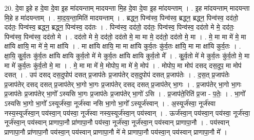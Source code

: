 \documentclass[17pt]{extarticle}
\begin{document}
20. दे॒वा इ॒हे ह दे॒वा दे॒वा इ॒ह मा॑दयन्ताम् मादयन्ता मि॒ह दे॒वा दे॒वा इ॒ह मा॑दयन्ताम् । . इ॒ह मा॑दयन्ताम् मादयन्ता मि॒हे ह मा॑दयन्ताम् । . मा॒द॒य॒न्ता॒मिति॑ मादयन्ताम् । . ब्रद्ध्न॒ पिन्व॑स्व॒ पिन्व॑स्व॒ ब्रद्ध्न॒ ब्रद्ध्न॒ पिन्व॑स्व॒ दद॑तो॒ दद॑तः॒ पिन्व॑स्व॒ ब्रद्ध्न॒ ब्रद्ध्न॒ पिन्व॑स्व॒ दद॑तः । . पिन्व॑स्व॒ दद॑तो॒ दद॑तः॒ पिन्व॑स्व॒ पिन्व॑स्व॒ दद॑तो मे मे॒ दद॑तः॒ पिन्व॑स्व॒ पिन्व॑स्व॒ दद॑तो मे । . दद॑तो मे मे॒ दद॑तो॒ दद॑तो मे॒ मा मा मे॒ दद॑तो॒ दद॑तो मे॒ मा । . मे॒ मा मा मे॑ मे॒ मा क्षा॑यि क्षायि॒ मा मे॑ मे॒ मा क्षा॑यि । . मा क्षा॑यि क्षायि॒ मा मा क्षा॑यि कुर्व॒तः कु॑र्व॒तः क्षा॑यि॒ मा मा क्षा॑यि कुर्व॒तः । . क्षा॒यि॒ कु॒र्व॒तः कु॑र्व॒तः क्षा॑यि क्षायि कुर्व॒तो मे॑ मे कुर्व॒तः क्षा॑यि क्षायि कुर्व॒तो मे᳚ । . कु॒र्व॒तो मे॑ मे कुर्व॒तः कु॑र्व॒तो मे॒ मा मा मे॑ कुर्व॒तः कु॑र्व॒तो मे॒ मा । . मे॒ मा मा मे॑ मे॒ मोपोप॒ मा मे॑ मे॒ मोप॑ । . मोपोप॒ मा मोप॑ दसद् दस॒दुप॒ मा मोप॑ दसत् । . उप॑ दसद् दस॒दुपोप॑ दसत् प्र॒जाप॑तेः प्र॒जाप॑तेर् दस॒दुपोप॑ दसत् प्र॒जाप॑तेः । . द॒स॒त् प्र॒जाप॑तेः प्र॒जाप॑तेर् दसद् दसत् प्र॒जाप॑तेर् भा॒गो भा॒गः प्र॒जाप॑तेर् दसद् दसत् प्र॒जाप॑तेर् भा॒गः । . प्र॒जाप॑तेर् भा॒गो भा॒गः प्र॒जाप॑तेः प्र॒जाप॑तेर् भा॒गो᳚ ऽस्यसि भा॒गः प्र॒जाप॑तेः प्र॒जाप॑तेर् भा॒गो॑ ऽसि । . प्र॒जाप॑ते॒रिति॑ प्र॒जा - प॒तेः॒ । . भा॒गो᳚ ऽस्यसि भा॒गो भा॒गो᳚ ऽस्यूर्ज॑स्वा॒ नूर्ज॑स्वा नसि भा॒गो भा॒गो᳚ ऽस्यूर्ज॑स्वान् । . अ॒स्यूर्ज॑स्वा॒ नूर्ज॑स्वा नस्य॒स्यूर्ज॑स्वा॒न् पय॑स्वा॒न् पय॑स्वा॒ नूर्ज॑स्वा नस्य॒स्यूर्ज॑स्वा॒न् पय॑स्वान् । . ऊर्ज॑स्वा॒न् पय॑स्वा॒न् पय॑स्वा॒ नूर्ज॑स्वा॒ नूर्ज॑स्वा॒न् पय॑स्वान् प्राणापा॒नौ प्रा॑णापा॒नौ पय॑स्वा॒ नूर्ज॑स्वा॒ नूर्ज॑स्वा॒न् पय॑स्वान् प्राणापा॒नौ । . पय॑स्वान् प्राणापा॒नौ प्रा॑णापा॒नौ पय॑स्वा॒न् पय॑स्वान् प्राणापा॒नौ मे॑ मे प्राणापा॒नौ पय॑स्वा॒न् पय॑स्वान् प्राणापा॒नौ मे᳚ । \newline
\end{document}
